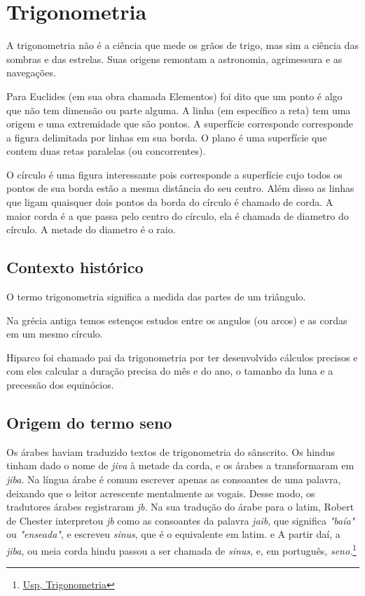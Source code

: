 \chapter{Trigonometria}

A trigonometria não é a ciência que mede os grãos de trigo, mas sim a ciência das sombras e das estrelas. Suas origens remontam a astronomia, agrimessura e as navegações.

Para Euclides (em sua obra chamada Elementos) foi dito que um ponto é algo que não tem dimensão ou parte alguma. A linha (em específico a reta) tem uma origem e uma extremidade que são pontos. A superfície corresponde corresponde a figura delimitada por linhas em sua borda. O plano é uma superfície que contem duas retas paralelas (ou concorrentes).

O círculo é uma figura interessante pois corresponde a superfície cujo todos os pontos de sua borda estão a mesma distância do seu centro. Além disso as linhas que ligam quaisquer dois pontos da borda do círculo é chamado de corda. A maior corda é a que passa pelo centro do círculo, ela é chamada de diametro do círculo. A metade do diametro é o raio.

\section{Contexto histórico}

O termo trigonometria significa a medida das partes de um triângulo.

Na grécia antiga temos estenços estudos entre os angulos (ou arcos) e as cordas em um mesmo círculo.

Hiparco foi chamado pai da trigonometria por ter desenvolvido cálculos precisos e com eles calcular a duração precisa do mês e do ano, o tamanho da luna e a precessão dos equinócios.

\section{Origem do termo seno}

Os árabes haviam traduzido textos de trigonometria do sânscrito. Os hindus tinham dado o nome de \textit{jiva} à metade da corda, e os árabes a transformaram em \textit{jiba}. Na língua árabe é comum escrever apenas as consoantes de uma palavra, deixando que o leitor acrescente mentalmente as vogais. Desse modo, os tradutores árabes registraram \textit{jb}. Na sua tradução do árabe para o latim, Robert de Chester interpretou \textit{jb} como as consoantes da palavra \textit{jaib}, que significa \textit{"baía"} ou \textit{"enseada"}, e escreveu \textit{sinus}, que é o equivalente em latim.\cite{eli1998trigonometric} e \cite{da2003historia} A partir daí, a \textit{jiba}, ou meia corda hindu passou a ser chamada de \textit{sinus}, e, em português, \textit{seno}.\footnote{\href{http://ecalculo.if.usp.br/historia/historia_trigonometria.htm}{Usp, Trigonometria}}

